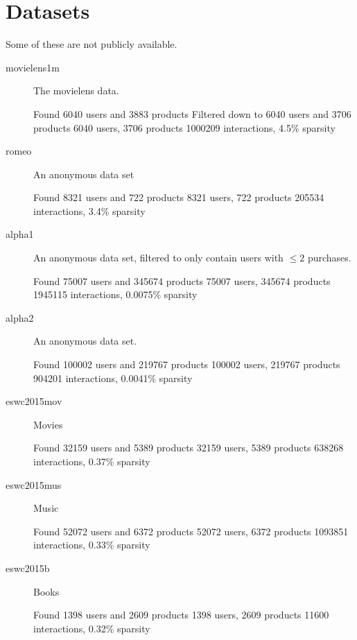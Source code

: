 \chapter{Datasets}\label{cha:datasets}

Some of these are not publicly available.


\begin{description}
    \item[movielens1m]

        The movielens data.

        Found 6040 users and 3883 products
        Filtered down to 6040 users and 3706 products
        6040 users, 3706 products
        1000209 interactions, 4.5\% sparsity

    \item[romeo]

        An anonymous data set

        Found 8321 users and 722 products
        8321 users, 722 products
        205534 interactions, 3.4\% sparsity

    \item[alpha1]

        An anonymous data set, filtered to only contain users with $\leq 2$ purchases.

        Found 75007 users and 345674 products
        75007 users, 345674 products
        1945115 interactions, 0.0075\% sparsity

    \item[alpha2]

        An anonymous data set.

        Found 100002 users and 219767 products
        100002 users, 219767 products
        904201 interactions, 0.0041\% sparsity

    \item[eswc2015mov]

        Movies 

        Found 32159 users and 5389 products
        32159 users, 5389 products
        638268 interactions, 0.37\% sparsity

    \item[eswc2015mus]

        Music

        Found 52072 users and 6372 products
        52072 users, 6372 products
        1093851 interactions, 0.33\% sparsity

    \item[eswc2015b]

        Books

        Found 1398 users and 2609 products
        1398 users, 2609 products
        11600 interactions, 0.32\% sparsity

\end{description}

